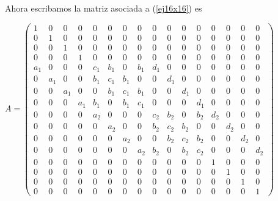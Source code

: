 Ahora escribamos la matriz asociada a (\ref{ej16x16}) es \vspace{1em}

\setcounter{MaxMatrixCols}{16}
\begin{center}
$ A =
\begin{pmatrix}
	1	 	& 0 		& 0 		& 	0	 	& 0	 	& 0 		& 0	 	& 	0 		& 0		& 0 		& 0 		& 	0	  & 0		& 0	 	& 0 		& 	0\\
	0	 	& 1 		& 0 		& 	0	 	& 0 		& 0		& 0	 	& 	0 		& 0 		& 0 		& 0 		& 	0	  & 0 		& 0	 	& 0 		& 	0\\
	0	 	& 0 		& 1 		& 	0	 	& 0 		& 0 		& 0	 	& 	0 		& 0 		& 0 		& 0 		& 	0	  & 0 		& 0	 	& 0 		& 	0\\
	0 		& 0 		& 0 		& 1	 	& 0 		& 0 		& 0	 	& 	0 		& 0 		& 0 		& 0 		& 	0	  & 0 		& 0	 	& 0 		& 	0\\
	a_1 & 0 		& 0		& 0	 	& c_1 	& b_1 & 0		& b_1 & d_1 	& 0 		& 0 		& 	0	  & 0 		& 0	 	& 0 		& 	0\\
	0 		& a_1	& 0		& 0	 	& b_1 	& c_1 & b_1 	& 0 		& 0 		& d_1 	& 0 		& 	0	  & 0 		& 0	 	& 0 		& 	0\\
	0 		& 	0		& a_1	& 0	 	& 0		& b_1 	& c_1 & b_1 	& 0 		& 0 		& d_1 	& 0 	  & 0		& 0 	 	& 0		& 0\\
	0	 	& 0 		& 0 		& a_1	& b_1	& 0 		& b_1 	& c_1	& 0		& 0 		& 0 		& d_1 & 0 		& 0	 	& 0 		& 	0\\
	0 		& 0	 	& 0 		& 	0		&	a_2 & 0 		& 0		& 0	 	& c_2 	& b_2 & 0		& b_2 & d_2 	& 0 		& 0 		& 	0\\
	0 		& 	0	  & 0 		& 0	 	& 0 		& a_2	& 0		& 0	 	& b_2 	& c_2 & b_2 	& 0 		& 0 		& d_2 	& 0		& 0\\
	0 		& 	0		& 0 	 	& 0		& 0		& 0 		& a_2	& 0	 	& 0		& b_2 	& c_2 & b_2 	& 0 		& 0 		& d_2 	& 0\\ 	 
	0	 	& 0 		& 0 		& 0 		& 0	 	& 0 		& 	0		& a_2	& b_2	& 0 		& b_2 	& c_2	& 0		& 0 		& 0 		& d_2\\
	0	 	& 0 		& 0 		& 	0	 	& 0	 	& 0 		& 0	 	& 	0 		& 0		& 0 		& 0 		& 	0	  & 1		& 0	 	& 0 		& 	0\\
	0	 	& 0 		& 0 		& 	0	 	& 0 		& 0		& 0	 	& 	0 		& 0 		& 0 		& 0 		& 	0	  & 0 		& 1	 	& 0 		& 	0\\
	0	 	& 0 		& 0 		& 	0	 	& 0 		& 0 		& 0	 	& 	0 		& 0 		& 0 		& 0 		& 	0	  & 0 		& 0	 	& 1 		& 	0\\
	0 		& 0 		& 0 		& 0	 	& 0 		& 0 		& 0	 	& 	0 		& 0 		& 0 		& 0 		& 	0	  & 0 		& 0	 	& 0 		& 	1
\end{pmatrix} 
$
\end{center}

